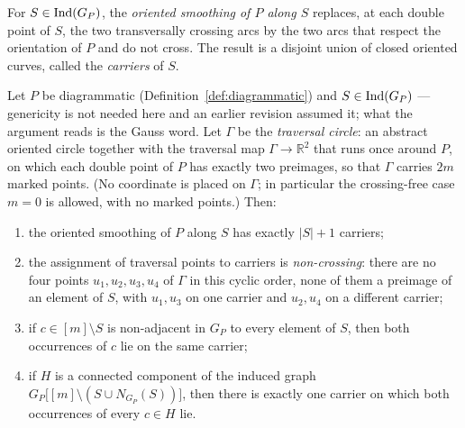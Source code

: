 \begin{definition}\label{def:smoothing}
For $S\in\operatorname{Ind}(G_P)$, the \emph{oriented smoothing of $P$ along $S$} replaces, at
each double point of $S$, the two transversally crossing arcs by the two arcs
that respect the orientation of $P$ and do not cross. The result is a disjoint
union of closed oriented curves, called the \emph{carriers} of $S$.
\end{definition}

\begin{lemma}\label{lem:carriers}
Let $P$ be diagrammatic (Definition~\ref{def:diagrammatic}) and
$S\in\operatorname{Ind}(G_P)$ --- genericity is not needed here and an earlier revision
assumed it; what the argument reads is the Gauss word. Let $\Gamma$ be the
\emph{traversal circle}: an abstract oriented circle
together with the traversal map $\Gamma\to\mathbb R^2$ that runs once around
$P$, on which each double point of $P$ has exactly two preimages, so that
$\Gamma$ carries $2m$ marked points. (No coordinate is placed on $\Gamma$; in
particular the crossing-free case $m=0$ is allowed, with no marked points.) Then:
\begin{enumerate}
\item[(i)] the oriented smoothing of $P$ along $S$ has exactly $|S|+1$ carriers;
\item[(ii)] the assignment of traversal points to carriers is \emph{non-crossing}:
there are no four points $u_1,u_2,u_3,u_4$ of $\Gamma$ in this cyclic order,
none of them a preimage of an element of $S$, with $u_1,u_3$ on one carrier and
$u_2,u_4$ on a different carrier;
\item[(iii)] if $c\in[m]\setminus S$ is non-adjacent in $G_P$ to every element of
$S$, then both occurrences of $c$ lie on the same carrier;
\item[(iv)] if $H$ is a connected component of the induced graph
$G_P\bigl[[m]\setminus(S\cup N_{G_P}(S))\bigr]$, then there is exactly one
carrier on which both occurrences of every $c\in H$ lie.
\end{enumerate}
\end{lemma}

